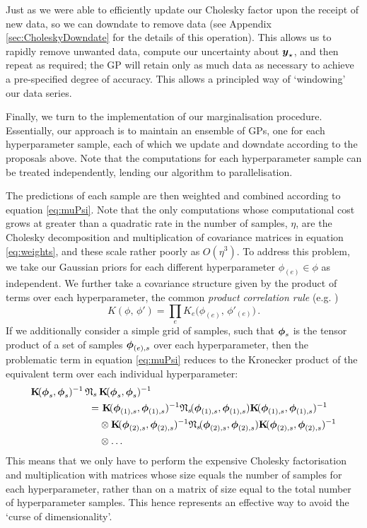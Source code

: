 \documentclass{acmtrans2m}
\begin{document}
Just as we were able to efficiently update our Cholesky factor upon the receipt of new data, so we can downdate to remove data (see Appendix \ref{sec:CholeskyDowndate} for the details of this operation). This allows us to rapidly remove unwanted data, compute our uncertainty about $\boldsymbol{y}_\star$, and then repeat as required; the GP will retain only as much data as necessary to achieve a pre-specified degree of accuracy. This allows a principled way of `windowing' our data series.

Finally, we turn to the implementation of our marginalisation procedure. Essentially, our approach is to maintain an ensemble of GPs, one for each hyperparameter sample, each of which we update and downdate according to the proposals above. Note that the computations for each hyperparameter sample can be treated independently, lending our algorithm to parallelisation. 

The predictions of each sample are then weighted and combined according to equation \eqref{eq:muPsi}. Note that the only computations whose computational cost grows at greater than a quadratic rate in the number of samples, $\eta$, are the Cholesky decomposition and multiplication of covariance matrices in equation \eqref{eq:weights}, and these scale rather poorly as $O(\eta^3)$. To address this problem, we take our Gaussian priors for each different hyperparameter $\phi_{(e)} \in \phi$ as independent. We further take a covariance structure given by the product of terms over each hyperparameter, the common \emph{product correlation rule} (e.g. )
\begin{equation}
 K(\phi,\,\phi')=\prod_e K_e\Big(\phi_{(e)},\,\phi'_{(e)}\Big)\,.
\end{equation}
If we additionally consider a simple grid of samples, such that $\boldsymbol{\phi}_s$ is the tensor product of a set of samples $\boldsymbol{\phi}_{(e),s}$ over each hyperparameter, then the problematic term in equation \eqref{eq:muPsi} reduces to the Kronecker product of the equivalent term over each individual hyperparameter:
\begin{align}\label{eq:KNK}
\mat{K} \!(\vph_s,\vph_s)^{-1}\,\Nt\,&\mat{K}\!(\vph_s,\vph_s)^{-1}\nonumber\\
 = & ~\mat{K}\!(\vph_{(1),s},\vph_{(1),s})^{-1}\Nt\!(\vph_{(1),s},\vph_{(1),s})\mat{K}\!(\vph_{(1),s},\vph_{(1),s})^{-1}\nonumber\\ & \otimes \mat{K}\!(\vph_{(2),s},\vph_{(2),s})^{-1}\Nt\!(\vph_{(2),s},\vph_{(2),s})\mat{K}\!(\vph_{(2),s},\vph_{(2),s})^{-1}\nonumber\\ & \otimes \ldots
\end{align}
This means that we only have to perform the expensive Cholesky factorisation and multiplication with matrices whose size equals the number of samples for each hyperparameter, rather than on a matrix of size equal to the total number of hyperparameter samples. This hence represents an effective way to avoid the `curse of dimensionality'. 
\end{document}

